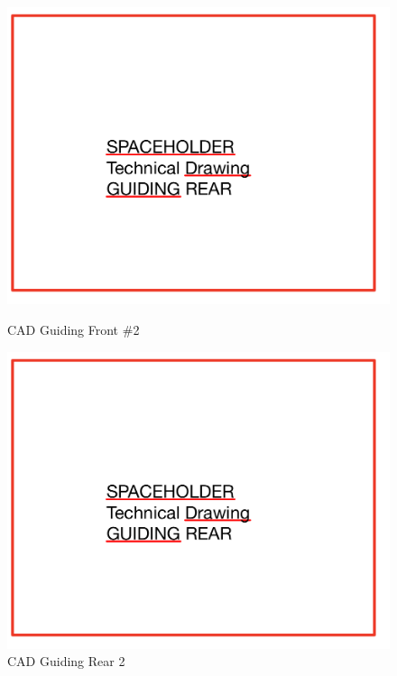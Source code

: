 \begin{figure}[!ht]
  \centering
  \begin{minipage}[b]{0.45\linewidth}
    \includegraphics[width=\linewidth]{texfiles/mech/eimg/braking/guiding_tech_rear.jpg}
    \caption{CAD Guiding Front \#2}
    \label{fig:guiding_front_2}
  \end{minipage}
  \hspace{0.5cm}
  \begin{minipage}[b]{0.45\linewidth}
    \includegraphics[width=\linewidth]{texfiles/mech/eimg/braking/guiding_tech_rear.jpg}
    \caption{CAD Guiding Rear 2}
    \label{fig:guiding_rear_2}
  \end{minipage}
\end{figure}

